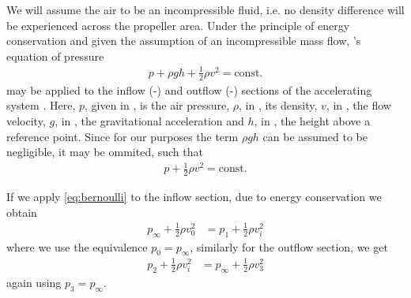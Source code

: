 We will assume the air to be an incompressible fluid, i.e. no density difference will be experienced across the propeller area. 
Under the principle of energy conservation and given the assumption of an incompressible mass flow, 's equation of pressure
%
\begin{align}
p + \rho g h + \frac{1}{2}\rho v^2 = \text{const.}
\end{align}
%
may be applied to the inflow (-) and outflow (-) sections of the accelerating system \cite{seddon2002}.
Here, $p$, given in \withunit{\newton\per\square\metre}, is the air pressure, 
$\rho$, in \withunit{\kilo\gram\per\cubic\metre}, its density,
$v$, in \withunit{\metre\per\second}, the flow velocity,
$g$, in , the gravitational acceleration and
$h$, in \withunit{\metre}, the height above a reference point.
%
%
Since for our purposes the term $\rho g h$ can be assumed to be negligible, it may be ommited, such that
%
\begin{align}
p + \frac{1}{2} \rho v^2 = \text{const.} \label{eq:bernoulli}
\end{align}

If we apply \cref{eq:bernoulli} to the inflow section, due to energy conservation we obtain
%
\begin{align}
p_\infty + \frac{1}{2} \rho v^2_0 &= p_1 + \frac{1}{2} \rho v^2_i \label{eq:bernoulli_inflow}
\end{align}
%
where we use the equivalence $p_0 = p_\infty$, similarly for the outflow section, we get
%
\begin{align}
p_2 + \frac{1}{2} \rho v^2_i &= p_\infty + \frac{1}{2} \rho v^2_3 \label{eq:bernoulli_outflow}
\end{align}
%
again using $p_3 = p_\infty$.

